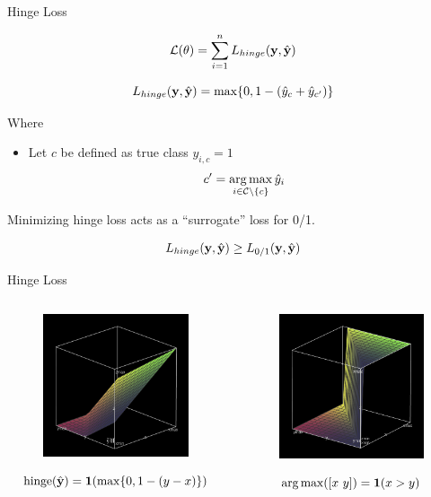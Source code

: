 \documentclass{beamer}
\begin{document}
\begin{frame}{Hinge Loss}

  \[{\mathcal{L}(\theta)} = \sum_{i=1}^n L_{hinge}(\mathbf{y},\hat{\mathbf{y}}) \] 


  \[ L_{hinge}(\mathbf{y}, \hat{\mathbf{y}}) =  \max\{0, 1 - (\hat{y}_{c} + \hat{y}_{c'}) \}  \]

  Where 
  \begin{itemize}
  \item   Let $c$ be defined as true class $y_{i, c} = 1$  
    \[c' = \argmax_{i \in \mcC \setminus\{c\}} \hat{y}_i \] 
  \end{itemize}

  \pause

  Minimizing hinge loss acts as a ``surrogate'' loss for 0/1. 

  \[ L_{hinge}(\mathbf{y}, \hat{\mathbf{y}}) \geq L_{0/1}(\mathbf{y}, \hat{\mathbf{y}})\] 
\end{frame}
\begin{frame}{Hinge Loss}
  \begin{columns}[t]
    \begin{column}[t]{0.5\textwidth}


      \begin{figure}
        \centering
        \includegraphics[width=5cm]{hinge}

      \end{figure}
      \[\mathrm{hinge}(\hat{\mathbf{y}}) = \mathbf{1}(\max\{0, 1 - (y - x)\}) \]
    \end{column}

    \begin{column}[t]{0.5\textwidth}


      \begin{figure}
        \centering
      \includegraphics[width=5cm]{argmax}
      \end{figure}
      \[\argmax([x\ y]) = \indicator(x > y) \]      
    \end{column}
  \end{columns}
\end{frame}  
\end{document}
